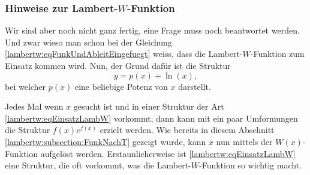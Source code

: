 \subsubsection{Hinweise zur Lambert-\(W\)-Funktion
	\label{lambertw:subsubsection:HinwLambertW}}
Wir sind aber noch nicht ganz fertig, eine Frage muss noch beantwortet werden. Und zwar wieso man schon bei der Gleichung \eqref{lambertw:eqFunkUndAbleitEingefuegt} weiss, dass die Lambert-\(W\)-Funktion zum Einsatz kommen wird.
Nun, der Grund dafür ist die Struktur
\begin{equation}
	y
	=
	p(x) +\operatorname{ln}(x),
	\label{lambertw:eqEinsatzLambW}
\end{equation}
bei welcher \(p(x)\) eine beliebige Potenz von \(x\) darstellt. 

Jedes Mal wenn \(x\) gesucht ist und in einer Struktur der Art \eqref{lambertw:eqEinsatzLambW} vorkommt, dann kann mit ein paar Umformungen die Struktur \(f(x)e^{f(x)}\) erzielt werden. Wie bereits in diesem Abschnitt \ref{lambertw:subsection:FunkNachT} gezeigt wurde, kann \(x\) nun mittels der \(W(x)\)-Funktion aufgelöst werden. Erstaunlicherweise ist \eqref{lambertw:eqEinsatzLambW} eine Struktur, die oft vorkommt, was die Lambert-\(W\)-Funktion so wichtig macht.   